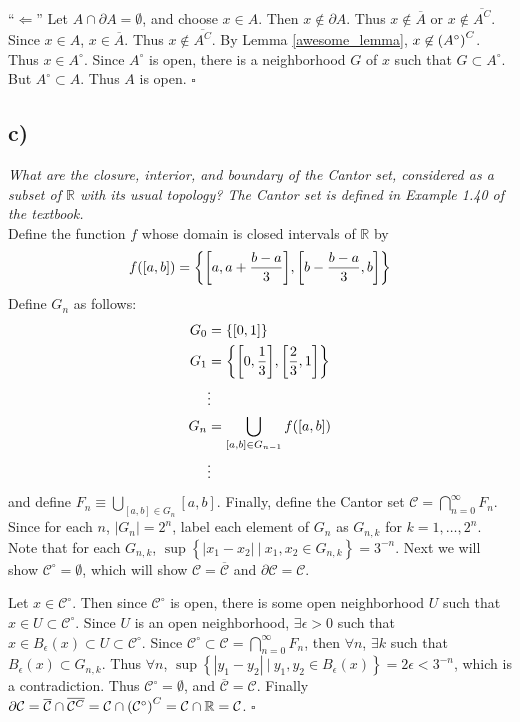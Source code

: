 \documentclass[12pt]{article}
\theoremstyle{plain}
\begin{document}
\noindent``$\Longleftarrow$''  Let $A \cap \partial A = \emptyset$, and choose $x \in A$.  Then $x \not\in \partial A$.  Thus $x \not\in \overline{A}$ or $x \not\in \overline{A^C}$.  Since $x \in A$, $x \in \overline{A}$.  Thus $x \not\in \overline{A^C}$.  By Lemma \ref{awesome_lemma}, $x \not\in \qty(A^\circ)^C$.  Thus $x \in A^\circ$.  Since $A^\circ$ is open, there is a neighborhood $G$ of $x$ such that $G \subset A^\circ$.  But $A^\circ \subset A$.  Thus $A$ is open. \hfill $\square$

\subsection*{ c)}
\emph{What are the closure, interior, and boundary of the Cantor set, considered as a subset of $\mathbb{R}$ with its usual topology?  The Cantor set is defined in Example 1.40 of the textbook.}\\

Define the function $f$ whose domain is closed intervals of $\mathbb{R}$ by 
\begin{align*}
    f([a,b]) = \left\{\qty[a, a + \frac{b-a}{3}], \qty[b - \frac{b-a}{3}, b]\right\}
\end{align*}
Define $G_n$ as follows:
\begin{align*}
    G_0 &= \left\{\qty[0,1]\right\} \\
    G_1 &= \left\{\qty[0, \frac{1}{3}], \qty[\frac{2}{3}, 1]\right\} \\
    &\vdots \\
    G_n &= \bigcup\limits_{[a,b] \in G_{n-1}} f([a,b])\\
    &\vdots
\end{align*}
and define $F_n \equiv \bigcup\limits_{[a,b] \in G_n} [a,b]$.  Finally, define the Cantor set $\mathcal{C} = \bigcap\limits_{n=0}^\infty F_n$.  Since for each $n$, $\left|G_n\right| = 2^n$, label each element of $G_n$ as $G_{n,k}$ for $k = 1, \dots, 2^n$.  Note that for each $G_{n,k}$, $\sup\left\{|x_1 - x_2|\ |\ x_1,x_2 \in G_{n,k}\right\} = 3^{-n}$. Next we will show $\mathcal{C}^\circ = \emptyset$, which will show $\mathcal{C} = \overline{\mathcal{C}}$ and $\partial\mathcal{C} = \mathcal{C}$.

Let $x \in \mathcal{C}^\circ$.  Then since $\mathcal{C}^\circ$ is open, there is some open neighborhood $U$ such that $x \in U \subset \mathcal{C}^\circ$.  Since $U$ is an open neighborhood, $\exists \epsilon > 0$ such that $x \in B_\epsilon(x) \subset U \subset \mathcal{C}^\circ$.  Since $\mathcal{C}^\circ \subset \mathcal{C} = \bigcap\limits_{n=0}^\infty F_n$, then $\forall n$, $\exists k$ such that $B_\epsilon(x) \subset G_{n,k}$.  Thus $\forall n$, $\sup\left\{|y_1 - y_2|\ |\ y_1,y_2 \in B_\epsilon(x)\right\} = 2\epsilon < 3^{-n}$, which is a contradiction.  Thus $\mathcal{C}^\circ = \emptyset$, and $\overline{\mathcal{C}} = \mathcal{C}$.  Finally $\partial\mathcal{C} = \overline{\mathcal{C}} \cap \overline{\mathcal{C}^C} = \mathcal{C} \cap \qty(\mathcal{C}^\circ)^C = \mathcal{C} \cap \mathbb{R} = \mathcal{C}$. \hfill $\square$
\end{document}
